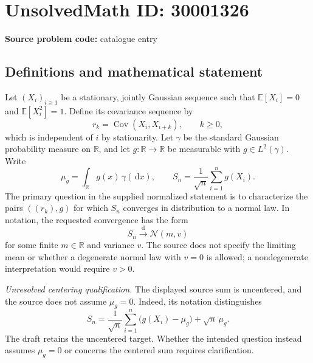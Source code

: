\documentclass[11pt]{article}
\newcommand{\R}{\mathbb{R}}
\newcommand{\E}{\mathbb{E}}
\newcommand{\dd}{\,\mathrm{d}}
\begin{document}
\section*{UnsolvedMath ID: 30001326}
\textbf{Source problem code:} catalogue entry
\subsection{Definitions and mathematical statement}
Let \((X_i)_{i\geq 1}\) be a stationary, jointly Gaussian sequence such that \(\E[X_i]=0\) and \(\E[X_i^2]=1\). Define its covariance sequence by
\[
r_k=\operatorname{Cov}(X_i,X_{i+k}),\qquad k\geq 0,
\]
which is independent of \(i\) by stationarity. Let \(\gamma\) be the standard Gaussian probability measure on \(\R\), and let \(g:\R\to\R\) be measurable with \(g\in L^2(\gamma)\). Write
\[
\mu_g=\int_{\R}g(x)\,\gamma(\dd x),\qquad
S_n=\frac{1}{\sqrt n}\sum_{i=1}^n g(X_i).
\]
The primary question in the supplied normalized statement is to characterize the pairs \(((r_k),g)\) for which \(S_n\) converges in distribution to a normal law. In notation, the requested convergence has the form
\[
S_n\xrightarrow{\mathrm d}\mathcal N(m,v)
\]
for some finite \(m\in\R\) and variance \(v\). The source does not specify the limiting mean or whether a degenerate normal law with \(v=0\) is allowed; a nondegenerate interpretation would require \(v>0\).

\textit{Unresolved centering qualification.} The displayed source sum is uncentered, and the source does not assume \(\mu_g=0\). Indeed, its notation distinguishes
\[
S_n=\frac{1}{\sqrt n}\sum_{i=1}^n\bigl(g(X_i)-\mu_g\bigr)+\sqrt n\,\mu_g.
\]
The draft retains the uncentered target. Whether the intended question instead assumes \(\mu_g=0\) or concerns the centered sum requires clarification.
\end{document}
